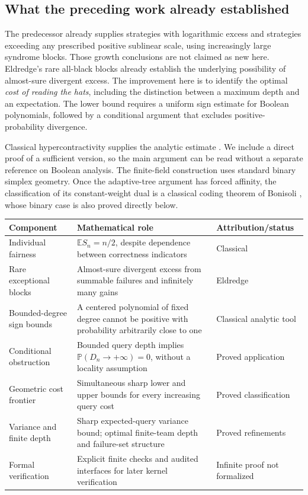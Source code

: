 \documentclass[11pt,letterpaper]{article}
\theoremstyle{definition}
\newcommand{\E}{\mathbb E}
\newcommand{\Prb}{\mathbb P}
\begin{document}
\subsection{What the preceding work already established}

The predecessor already supplies strategies with logarithmic excess and
strategies exceeding any prescribed positive sublinear scale, using
increasingly large syndrome blocks. Those growth conclusions are not
claimed as new here. Eldredge's rare all-black blocks already establish
the underlying possibility of almost-sure divergent excess.
The improvement here is to identify the optimal \emph{cost of reading
the hats}, including the distinction between a maximum depth and
an expectation. The lower bound requires a uniform sign estimate for
Boolean polynomials, followed by a conditional argument that excludes
positive-probability divergence.

Classical hypercontractivity supplies the analytic estimate
\cite{insp:AustrinHastad,insp:AustrinHastadSTOC}. We include a direct proof of a
sufficient version, so the main argument can be read without a
separate reference on Boolean analysis. The finite-field construction
uses standard binary simplex geometry. Once the adaptive-tree argument
has forced affinity, the classification of its constant-weight dual
is a classical coding theorem of Bonisoli \cite{insp:Bonisoli}, whose
binary case is also proved directly below.

\begin{longtable}{>{\raggedright\arraybackslash}p{}
 >{\raggedright\arraybackslash}p{}
 >{\raggedright\arraybackslash}p{}}
\toprule
Component & Mathematical role & Attribution/status\\
\midrule
\endhead
Individual fairness & \(\E S_n=n/2\), despite dependence between
correctness indicators & Classical\\
Rare exceptional blocks & Almost-sure divergent excess from summable
failures and infinitely many gains & Eldredge \cite{hat:Eldredge}\\
Bounded-degree sign bounds & A centered polynomial of fixed degree
cannot be positive with probability arbitrarily close to one &
Classical analytic tool\\
Conditional obstruction & Bounded query depth implies
\(\Prb(D_n\to+\infty)=0\), without a locality assumption &
Proved application\\
Geometric cost frontier & Simultaneous sharp lower and upper bounds
for every increasing query cost & Proved classification\\
Variance and finite depth & Sharp expected-query variance bound;
optimal finite-team depth and failure-set structure &
Proved refinements\\
Formal verification & Explicit finite checks and audited interfaces
for later kernel verification & Infinite proof not formalized\\
\bottomrule
\end{longtable}
\end{document}
